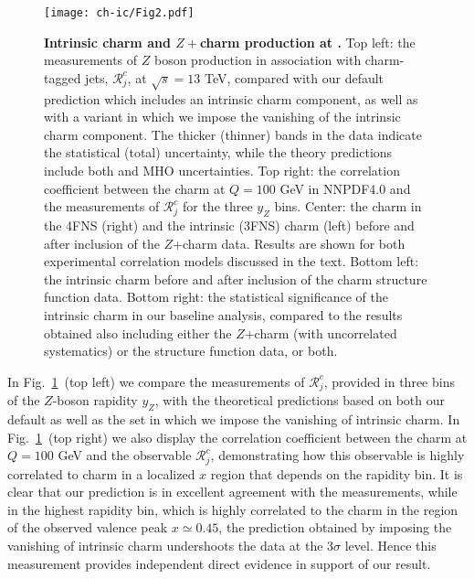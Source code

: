 \begin{figure}[htbp]
  \begin{center}
    \texttt{[image: ch-ic/Fig2.pdf]}
     \caption{\small
       \textbf{ Intrinsic charm and $Z+$charm production at \lhcb.}
       Top left: the \lhcb measurements of $Z$ boson production
      in association with charm-tagged jets, $\mathcal{R}_j^c$, at $\sqrt{s}=13$ TeV,  compared with
      our default prediction which includes an intrinsic charm component,
      as well as with a variant in which we impose the
      vanishing of the intrinsic charm component.
       The thicker (thinner) bands in the \lhcb data indicate the statistical
      (total) uncertainty, while the theory predictions include both \pdf and MHO uncertainties.
      Top right: the correlation coefficient between
     the  charm \pdf at $Q=100$ GeV in NNPDF4.0
      and the \lhcb measurements of $\mathcal{R}_j^c$ 
     for the three $y_Z$ bins.
     Center: the charm \pdf
     in the 4FNS (right) and the intrinsic (3FNS) charm \pdf (left)
     before and after inclusion of the \lhcb $Z$+charm data.
     Results are shown
     for both experimental correlation models discussed in the text.
     Bottom left: the intrinsic charm \pdf before and after inclusion
     of the \emc charm structure function data.
     Bottom right: the statistical significance of the
     intrinsic charm \pdf in our baseline analysis, compared to the results
     obtained also including either the \lhcb $Z$+charm (with uncorrelated
     systematics) or the \emc
     structure function data, or both.
  \label{fig:ic/Zc} }
\end{center}
\end{figure}

In Fig.~\ref{fig:ic/Zc}~(top left) we compare the \lhcb measurements of $\mathcal{R}_j^c$, provided
in three bins of the $Z$-boson rapidity
$y_Z$, with the theoretical predictions
 based on both our default \pdfs as well as the \pdf set in
 which we impose the vanishing of intrinsic charm.
 In Fig.~\ref{fig:ic/Zc}~(top right)
we also display the  correlation coefficient between
 the  charm \pdf at $Q=100$ GeV 
 and the observable  $\mathcal{R}_j^c$, demonstrating how this observable
 is highly
 correlated to charm in a localized
 $x$ region that depends on the rapidity bin.
 It is clear that
 our prediction is in excellent agreement with the \lhcb measurements, while in the
 highest rapidity bin, which is highly correlated to the charm \pdf in
 the region of the observed valence peak $x\simeq 0.45$, the prediction
 obtained by imposing the vanishing of intrinsic charm undershoots the
 data at the $3\sigma$ level.
%
 Hence this measurement provides
 independent direct evidence in support of our result.

